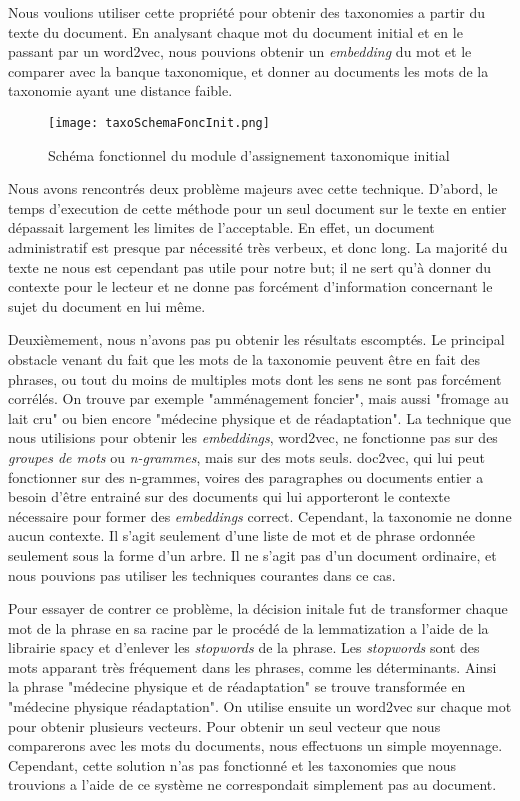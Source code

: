 Nous voulions utiliser cette propriété pour obtenir des taxonomies a partir du texte du document. En analysant chaque mot du document initial et en le passant par un word2vec, nous pouvions obtenir un \textit{embedding} du mot et le comparer avec la banque taxonomique, et donner au documents les mots de la taxonomie ayant une distance faible. 

\begin{figure}[h!]
  \centering
  \texttt{[image: taxoSchemaFoncInit.png]}
	\caption[]{Schéma fonctionnel du module d'assignement taxonomique initial}
  \label{taxoInit}
\end{figure}


Nous avons rencontrés deux problème majeurs avec cette technique. D'abord, le temps d'execution de cette méthode pour un seul document sur le texte en entier dépassait largement les limites de l'acceptable. En effet, un document administratif est presque par nécessité très verbeux, et donc long. La majorité du texte ne nous est cependant pas utile pour notre but; il ne sert qu'à donner du contexte pour le lecteur et ne donne pas forcément d'information concernant le sujet du document en lui même. 

Deuxièmement, nous n'avons pas pu obtenir les résultats escomptés. Le principal obstacle venant du fait que les mots de la taxonomie peuvent être en fait des phrases, ou tout du moins de multiples mots dont les sens ne sont pas forcément corrélés. On trouve par exemple "amménagement foncier", mais aussi "fromage au lait cru" ou bien encore "médecine physique et de réadaptation". La technique que nous utilisions pour obtenir les \textit{embeddings}, word2vec, ne fonctionne pas sur des \textit{groupes de mots} ou \textit{n-grammes}, mais sur des mots seuls. doc2vec, qui lui peut fonctionner sur des n-grammes, voires des paragraphes ou documents entier a besoin d'être entrainé sur des documents qui lui apporteront le contexte nécessaire pour former des \textit{embeddings} correct. Cependant, la taxonomie ne donne aucun contexte. Il s'agit seulement d'une liste de mot et de phrase ordonnée seulement sous la forme d'un arbre. Il ne s'agit pas d'un document ordinaire, et nous pouvions pas utiliser les techniques courantes dans ce cas. 

Pour essayer de contrer ce problème, la décision initale fut de transformer chaque mot de la phrase en sa racine par le procédé de la lemmatization a l'aide de la librairie spacy\cite{spacy} et d'enlever les \textit{stopwords} de la phrase. Les \textit{stopwords} sont des mots apparant très fréquement dans les phrases, comme les déterminants. Ainsi la phrase "médecine physique et de réadaptation" se trouve transformée en "médecine physique réadaptation". On utilise ensuite un word2vec sur chaque mot pour obtenir plusieurs vecteurs. Pour obtenir un seul vecteur que nous comparerons avec les mots du documents, nous effectuons un simple moyennage. Cependant, cette solution n'as pas fonctionné et les taxonomies que nous trouvions a l'aide de ce système ne correspondait simplement pas au document. 

